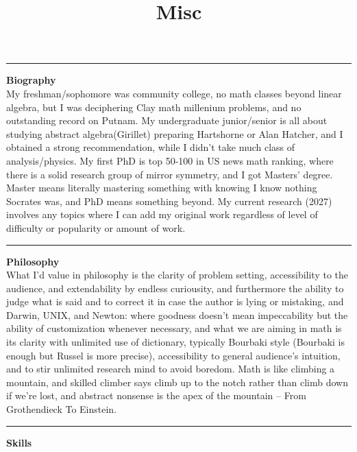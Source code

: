 \documentclass{article}
\title{Misc}
\begin{document}



\noindent\rule{\textwidth}{0.4pt}

\noindent
\textbf{Biography} \\

\noindent
My freshman/sophomore was community college, no math classes beyond linear algebra,
but I was deciphering Clay math millenium problems, and no outstanding record on Putnam.
My undergraduate junior/senior is all about studying abstract algebra(Girillet) preparing Hartshorne or Alan Hatcher, 
and I obtained a strong recommendation, while I didn't take much class of analysis/physics.
My first PhD is top 50-100 in US news math ranking, where there is a solid research group of mirror symmetry, and I got Masters' degree.
Master means literally mastering something with knowing I know nothing Socrates was, and PhD means something beyond.
My current research (2027) involves any topics where I can add my original work regardless of level of difficulty or popularity 
or amount of work.



\noindent\rule{\textwidth}{0.4pt}

\noindent
\textbf{Philosophy} \\

\noindent
What I'd value in philosophy is the clarity of problem setting, accessibility to the audience, and extendability by endless curiousity, 
and furthermore the ability to judge what is said and to correct it in case the author is lying or mistaking,
and Darwin, UNIX, and Newton: where goodness doesn't mean impeccability but the ability of customization whenever necessary,
and what we are aiming in math is its clarity with unlimited use of dictionary, 
typically Bourbaki style (Bourbaki is enough but Russel is more precise),
accessibility to general audience's intuition, and to stir unlimited research mind to avoid boredom.
Math is like climbing a mountain, and skilled climber says climb up to the notch rather than climb down if we're lost, 
and abstract nonsense is the apex of the mountain -- From Grothendieck To Einstein. 



\noindent\rule{\textwidth}{0.4pt}

\noindent
\textbf{Skills} \\
\end{document}
